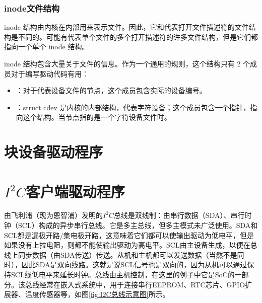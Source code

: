 \documentclass[lang=cn,newtx,10pt,scheme=chinese]{elegantbook}
\begin{document}
\subsection{inode文件结构}

inode 结构由内核在内部用来表示文件。因此，它和代表打开文件描述符的文件结构是不同的。可能有代表单个文件的多个打开描述符的许多文件结构，但是它们都指向一个单个 inode 结构。

inode 结构包含大量关于文件的信息。作为一个通用的规则，这个结构只有 2 个成员对于编写驱动代码有用：

\begin{itemize}
  \item {}：对于代表设备文件的节点，这个成员包含实际的设备编号。
  \item {}：struct cdev 是内核的内部结构，代表字符设备；这个成员包含一个指针，指向这个结构。当节点指的是一个字符设备文件时。
\end{itemize}

\chapter{块设备驱动程序}

\chapter{\texorpdfstring{$I^2C$客户端驱动程序}{I2C客户端驱动程序}}

由飞利浦（现为恩智浦）发明的$I^2C$总线是双线制：由串行数据（SDA）、串行时钟（SCL）构成的异步串行总线。它是多主总线，但多主模式未广泛使用。SDA和SCL都是漏极开路/集电极开路，这意味着它们都可以使输出驱动为低电平，但是如果没有上拉电阻，则都不能使输出驱动为高电平。SCL由主设备生成，以便在总线上同步数据（由SDA传送）传送。从机和主机都可以发送数据（当然不是同时），因此SDA是双向线路。这就是说SCL信号也是双向的，因为从机可以通过保持SCL线低电平来延长时钟。总线由主机控制，在这里的例子中它是SoC的一部分。该总线经常在嵌入式系统中，用于连接串行EEPROM、RTC芯片、GPIO扩展器、温度传感器等，如图\ref{fig:I2C总线示意图}所示。
\end{document}
